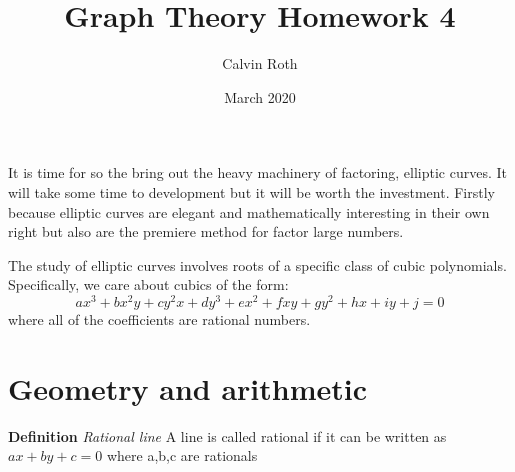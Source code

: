 \documentclass{article}
\title{Graph Theory Homework 4}
\author{Calvin Roth}
\date{March 2020}
\begin{document}
\newtheorem{theorem}{Theorem}
\newtheorem{lem}{Lemma}[section]
\newtheorem{claim}[lem]{Claim}

\newcommand{\prob}[1]{\section{} \noindent \textbf{Statement} #1 $ $\\ \textbf{Solution} $ $\\ }
\newcommand{\soln}{\noindent \textbf{Solution} $ $\\ }
\newcommand{\sol}{\noindent \textbf{Solution} $ $}

\newcommand{\IC}[1]{\noindent \textbf{Inductive Case} #1 $ $ \\}
\newcommand{\BC}[1]{\noindent \textbf{Base Case} #1 $ $ \\}

\newcommand{\inner}[1]{\langle #1 | #1\rangle}
\newcommand{\R}{\mathbb{R}}
\newcommand{\Z}{\mathbb{Z}}
\newcommand{\N}{\mathbb{N}}
\newcommand{\C}{\mathbb{C}}
\newcommand{\Q}{\mathbb{Q}}

\newcommand{\curve}[1]{C($\#1$)}

\newcommand{\set}[1]{\{$#1$\}}
\newcommand{\setc}[2]{\{$#1$ : $#2$\}}
\newcommand{\term}[2]{\textbf{Definition} \textit{#1} #2 $ $ \\}
\makeatletter
\renewcommand{\@seccntformat}[1]{Chapter \csname the#1\endcsname\quad}
\makeatother

It is time for so the bring out the heavy machinery of factoring, elliptic curves. It will take some time to development but it will be worth the investment. Firstly because elliptic curves are elegant and mathematically interesting in their own right but also are the premiere method for factor large numbers.

The study of elliptic curves involves roots of a specific class of cubic polynomials. Specifically, we care about cubics of the form: \begin{equation}
    ax^3 +  bx^2 y + c y^2 x + d y^3 + e x^2 + f x y + g y^2 + h x + i y + j = 0
\end{equation}
where all of the coefficients are rational numbers. 

\newpage
\section{Geometry and arithmetic}
\term{Rational line}{A line is called rational if it can be written as $ax + by + c = 0$ where a,b,c are rationals}
\end{document}
